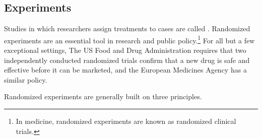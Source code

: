 \subsection[Experiments]{Experiments}
\label{experiments}

Studies in which researchers assign treatments to cases are called . Randomized experiments are an essential tool in research and public policy.\footnote{In medicine, randomized experiments are known as randomized clinical trials.}  For all but a few exceptional settings,  The US Food and Drug Administration requires that two independently conducted randomized trials confirm that a new drug is safe and effective before it can be marketed,  and the European Medicines Agency has a similar policy.  

Randomized experiments are generally built on three principles.


